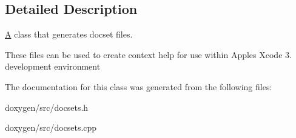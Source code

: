 \subsection{Detailed Description}
\mbox{\hyperlink{class_a}{A}} class that generates docset files.

These files can be used to create context help for use within Apple\textquotesingle{}s Xcode 3. development environment 

The documentation for this class was generated from the following files\+:\begin{DoxyCompactItemize}
\item 
doxygen/src/docsets.\+h\item 
doxygen/src/docsets.\+cpp\end{DoxyCompactItemize}
